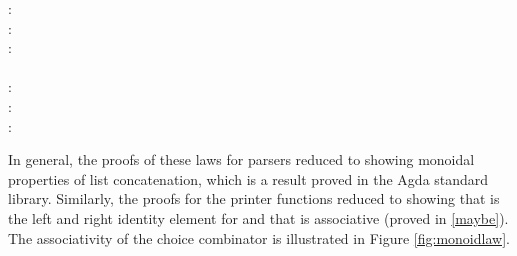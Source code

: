 \documentclass[12pt,a4paper,twoside,openright]{report}
\newcommand{\C}{\AgdaInductiveConstructor}
\newcommand{\F}{\AgdaFunction}
\begin{document}
{\begin{code}
\>[4] \>[6]:\>[8] \AgdaSymbol{(} \AgdaSymbol{:}  \AgdaSymbol{)} \>[10]\>[12] \AgdaSymbol{(}  \AgdaSymbol{)}  \<%
\\
\>[4] \>[6]:\>[8] \AgdaSymbol{(} \AgdaSymbol{:}  \AgdaSymbol{)} \>[10]\>[12] \AgdaSymbol{(}  \AgdaSymbol{)}  \<%
\\
\> \>[6]:\>[8] \AgdaSymbol{(}   \AgdaSymbol{:}  \AgdaSymbol{)} \>[10]\>[12] \AgdaSymbol{}  \AgdaSymbol{(}  \AgdaSymbol{)}  \AgdaSymbol{(}  \AgdaSymbol{)}  \AgdaSymbol{}\<%
\\
\\
\>[4] \>[6]:\>[8] \AgdaSymbol{(} \AgdaSymbol{:}  \AgdaSymbol{)} \>[10]\>[12] \AgdaSymbol{(}  \AgdaSymbol{)}  \<%
\\
\> \>[6]:\>[8] \AgdaSymbol{(} \AgdaSymbol{:}  \AgdaSymbol{)} \>[10]\>[12] \AgdaSymbol{(}  \AgdaSymbol{)}  \<%
\\
\> \>[6]:\>[8] \AgdaSymbol{(}   \AgdaSymbol{:}  \AgdaSymbol{)} \>[10]\>[12] \AgdaSymbol{}  \AgdaSymbol{(}  \AgdaSymbol{)}  \AgdaSymbol{(}  \AgdaSymbol{)}  \AgdaSymbol{}\<%
\end{code}

In general, the proofs of these laws for parsers reduced to showing monoidal properties of list concatenation, which is a result proved in the Agda standard library. Similarly, the proofs for the printer functions reduced to showing that \C{nothing} is the left and right identity element for \F{mplus} and that \F{mplus} is associative (proved in \autoref{maybe}). The associativity of the choice combinator is illustrated in Figure \ref{fig:monoidlaw}.

}
\end{document}
